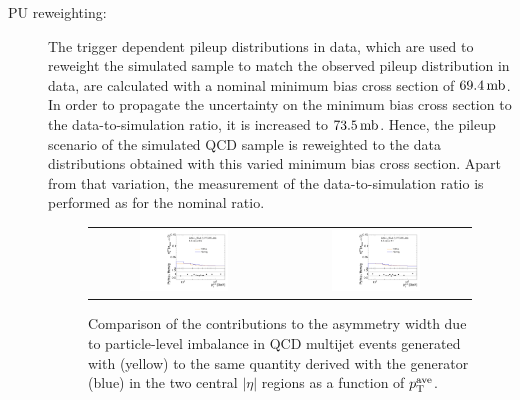 \begin{description}
 \item[PU reweighting:] The trigger dependent pileup distributions in data, which are used to reweight the simulated sample to match the observed pileup distribution in data, are calculated with a nominal minimum bias cross section of $69.4\,\rm{mb}$. In order to propagate the uncertainty on the minimum bias cross section to the data-to-simulation ratio, it is increased to $73.5\,\rm{mb}$. Hence, the pileup scenario of the simulated \pythia QCD sample is reweighted to the data distributions obtained with this varied minimum bias cross section. Apart from that variation, the measurement of the data-to-simulation ratio is performed as for the nominal ratio. \\
\begin{figure}[!tp]
  \centering
  \begin{tabular}{cc}
                \includegraphics[width=0.49\textwidth]{figures/PLI_comparison_Eta0_v4.pdf} &
                \includegraphics[width=0.49\textwidth]{figures/PLI_comparison_Eta1_v4.pdf} \\
  \end{tabular}
  \caption{Comparison of the contributions to the asymmetry width due to particle-level imbalance in QCD multijet events generated with \pythia (yellow) to the same quantity derived with the \herwig generator (blue) in the two central $|\eta|$ regions as a function of $p_{\text{T}}^\mathrm{ave}$.}
  \label{fig:pli_comp}
\end{figure}
 

\end{description}
